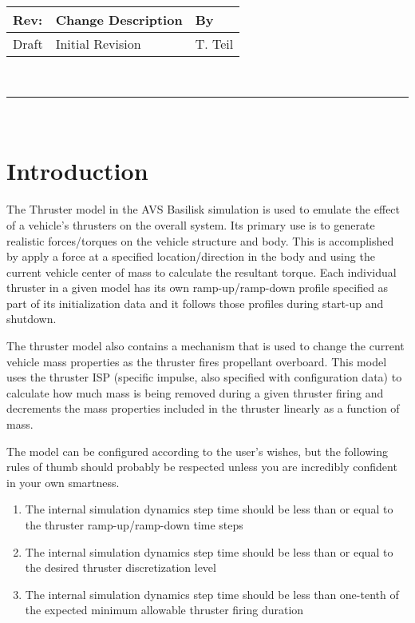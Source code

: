 \documentclass[]{BasiliskReportMemo}
\begin{document}
\makeCover



%
%
\pagestyle{empty}
{\renewcommand{\arraystretch}{2}
\noindent
\begin{longtable}{|p{0.5in}|p{4.5in}|p{1.14in}|}
\hline
{\bfseries Rev}: & {\bfseries Change Description} & {\bfseries By} \\
\hline
Draft & Initial Revision & T. Teil \\
\hline

\end{longtable}
}

\newpage
\setcounter{page}{1}
\pagestyle{fancy}

\tableofcontents
~\\ \hrule ~\\


\section{Introduction}
The Thruster model in the AVS Basilisk simulation is used to emulate the effect 
of a vehicle's thrusters on the overall system.  Its primary use is to generate 
realistic forces/torques on the vehicle structure and body.  This is 
accomplished by apply a force at a specified location/direction in the body and 
using the current vehicle center of mass to calculate the resultant torque.  
Each individual thruster in a given model has its own ramp-up/ramp-down profile 
specified as part of its initialization data and it follows those profiles during 
start-up and shutdown.

The thruster model also contains a mechanism that is used to change the current 
vehicle mass properties as the thruster fires propellant overboard.  This model 
uses the thruster ISP (specific impulse, also specified with configuration data) 
to calculate how much mass is being removed during a given thruster firing and 
decrements the mass properties included in the thruster linearly as a function 
of mass.  

The model can be configured according to the user's wishes, but the following 
rules of thumb should probably be respected unless you are incredibly confident 
in your own smartness.
\begin{enumerate}
\item{The internal simulation dynamics step time should be less than or equal 
     to the thruster ramp-up/ramp-down time steps}
\item{The internal simulation dynamics step time should be less than or equal to 
     the desired thruster discretization level}
\item{The internal simulation dynamics step time should be less than one-tenth 
    of the expected minimum allowable thruster firing duration}
\end{enumerate}
\end{document}
